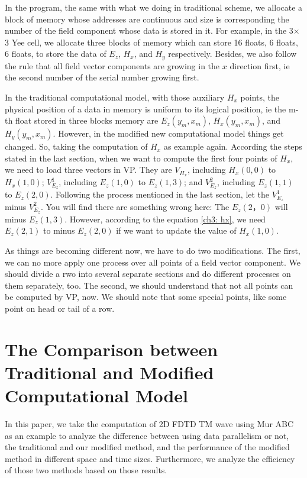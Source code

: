 In the program, the same with what we doing in traditional scheme, we allocate a block of memory whose addresses are continuous and size is corresponding the number of the field component whose data is stored in it. For example, in the 3$\times$3 Yee cell, we allocate three blocks of memory which can store 16 floats, 6 floats, 6 floats, to store the data of $E_z$, $H_x$, and $H_y$ respectively. Besides, we also follow the rule that all field vector components are growing in the $x$ direction first, ie the second number of the serial number growing first.

In the traditional computational model, with those auxiliary $H_x$ points, the physical position of a data in memory is uniform to its logical position, ie the m-th float stored in three blocks memory are $E_z(y_m,x_m)$, $H_x(y_m,x_m)$, and $H_y(y_m,x_m)$. However, in the modified new computational model things get changed. So, taking the computation of $H_x$ as example again. According the steps stated in the last section, when we want to compute the first four points of $H_x$, we need to load three vectors in VP. They are $V_{H_x}$, including $H_x(0,0)$ to $H_x(1,0)$; $V_{E_z}^1$, including $E_z(1,0)$ to $E_z(1,3)$; and $V_{E_z}^2$, including $E_z(1,1)$ to $E_z(2,0)$. Following the process mentioned in the last section, let the $V_{E_z}^1$ minus $V_{E_z}^2$. You will find there are something wrong here: The $E_z(2，0)$ will minus $E_z(1,3)$. However, according to the equation \eqref{ch3: hx}, we need $E_z(2,1)$ to minus $E_z(2,0)$ if we want to update the value of $H_x(1,0)$.

As things are becoming different now, we have to do two modifications. The first, we can no more apply one process over all points of a field vector component. We should divide a rwo into several separate sections and do different processes on them separately, too. The second, we should understand that not all points can be computed by VP, now. We should note that some special points, like some point on head or tail of a row.

\section{The Comparison between Traditional and Modified Computational Model}

In this paper, we take the computation of 2D FDTD TM wave using Mur ABC as an example to analyze the difference between using data parallelism or not, the traditional and our modified method, and the performance of the modified method in different space and time sizes. Furthermore, we analyze the efficiency of those two methods based on those results.

